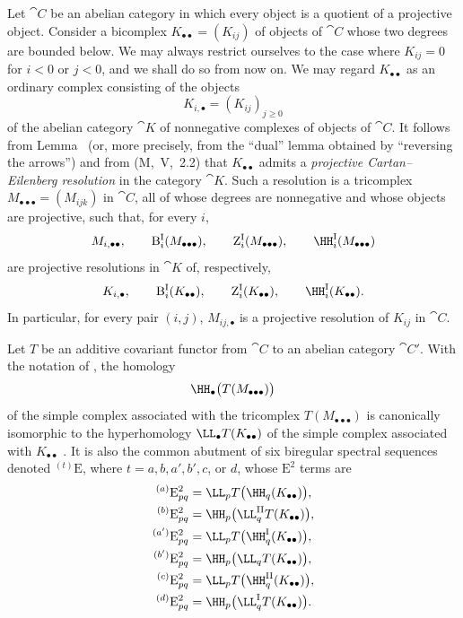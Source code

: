 \begin{env}[11.7.1]
\label{0.11.7.1}
Let $\cat{C}$ be an abelian category in which every object is a quotient of a
projective object.
Consider a bicomplex $K_{\bullet\bullet}=(K_{ij})$ of objects of $\cat{C}$ whose
two degrees are bounded below.
We may always restrict ourselves to the case where $K_{ij}=0$ for $i<0$ or
$j<0$, and we shall do so from now on.
We may regard $K_{\bullet\bullet}$ as an ordinary complex consisting of the
objects
\[
  K_{i,\bullet}=(K_{ij})_{j\geq 0}
\]
of the abelian category $\cat{K}$ of nonnegative complexes of objects of
$\cat{C}$.
It follows from Lemma~ (or, more precisely, from the
``dual'' lemma obtained by ``reversing the arrows'') and from (M,~V,~2.2)
that $K_{\bullet\bullet}$ admits a \emph{projective Cartan--Eilenberg
resolution} in the category $\cat{K}$.
Such a resolution is a tricomplex
$M_{\bullet\bullet\bullet}=(M_{ijk})$ in $\cat{C}$, all of whose degrees are
nonnegative and whose objects are projective, such that, for every $i$,
\[
  M_{i,\bullet\bullet},\qquad
  \mathrm{B}^{\mathrm{I}}_i(M_{\bullet\bullet\bullet}),\qquad
  \mathrm{Z}^{\mathrm{I}}_i(M_{\bullet\bullet\bullet}),\qquad
  \HH^{\mathrm{I}}_i(M_{\bullet\bullet\bullet})
\]
are projective resolutions in $\cat{K}$ of, respectively,
\[
  K_{i,\bullet},\qquad
  \mathrm{B}^{\mathrm{I}}_i(K_{\bullet\bullet}),\qquad
  \mathrm{Z}^{\mathrm{I}}_i(K_{\bullet\bullet}),\qquad
  \HH^{\mathrm{I}}_i(K_{\bullet\bullet}).
\]
In particular, for every pair $(i,j)$, $M_{ij,\bullet}$ is a projective
resolution of $K_{ij}$ in $\cat{C}$.
\end{env}

\begin{proposition}[11.7.2]
\label{0.11.7.2}
Let $T$ be an additive covariant functor from $\cat{C}$ to an abelian
category $\cat{C}'$.
With the notation of , the homology
\[
  \HH_\bullet\bigl(T(M_{\bullet\bullet\bullet})\bigr)
\]
of the simple complex associated with the tricomplex
$T(M_{\bullet\bullet\bullet})$ is canonically isomorphic to the
hyperhomology $\LL_\bullet T(K_{\bullet\bullet})$ of
the simple complex associated with $K_{\bullet\bullet}$
.
It is also the common abutment of six biregular spectral sequences denoted
${}^{(t)}\mathrm{E}$, where $t=a,b,a',b',c$, or $d$, whose
$\mathrm{E}^2$ terms are
\[
\begin{aligned}
  {}^{(a)}\mathrm{E}^2_{pq}
    &= \LL_pT\bigl(\HH_q(K_{\bullet\bullet})\bigr),\\
  {}^{(b)}\mathrm{E}^2_{pq}
    &= \HH_p\bigl(\LL^{\mathrm{II}}_qT(K_{\bullet\bullet})\bigr),\\
  {}^{(a')}\mathrm{E}^2_{pq}
    &= \LL_pT\bigl(\HH^{\mathrm{I}}_q(K_{\bullet\bullet})\bigr),\\
  {}^{(b')}\mathrm{E}^2_{pq}
    &= \HH_p\bigl(\LL_qT(K_{\bullet\bullet})\bigr),\\
  {}^{(c)}\mathrm{E}^2_{pq}
    &= \LL_pT\bigl(\HH^{\mathrm{II}}_q(K_{\bullet\bullet})\bigr),\\
  {}^{(d)}\mathrm{E}^2_{pq}
    &= \HH_p\bigl(\LL^{\mathrm{I}}_qT(K_{\bullet\bullet})\bigr).
\end{aligned}
\]
\end{proposition}

